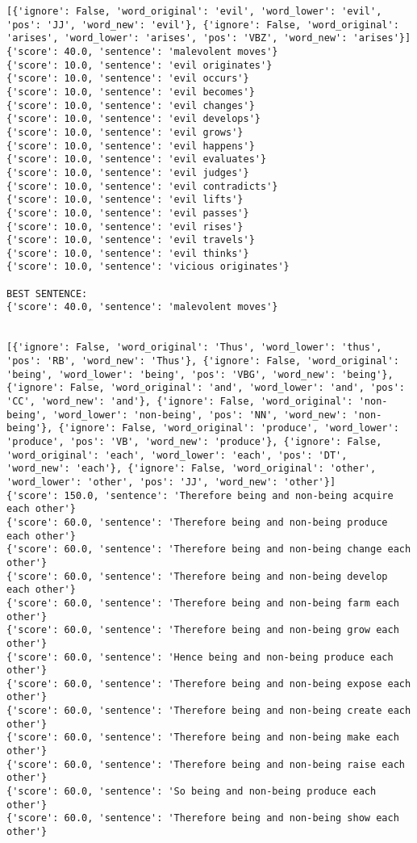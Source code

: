\documentclass[12pt,a4paper,oneside]{book}
\begin{document}
\begin{verbatim}
[{'ignore': False, 'word_original': 'evil', 'word_lower': 'evil', 'pos': 'JJ', 'word_new': 'evil'}, {'ignore': False, 'word_original': 'arises', 'word_lower': 'arises', 'pos': 'VBZ', 'word_new': 'arises'}]
{'score': 40.0, 'sentence': 'malevolent moves'}
{'score': 10.0, 'sentence': 'evil originates'}
{'score': 10.0, 'sentence': 'evil occurs'}
{'score': 10.0, 'sentence': 'evil becomes'}
{'score': 10.0, 'sentence': 'evil changes'}
{'score': 10.0, 'sentence': 'evil develops'}
{'score': 10.0, 'sentence': 'evil grows'}
{'score': 10.0, 'sentence': 'evil happens'}
{'score': 10.0, 'sentence': 'evil evaluates'}
{'score': 10.0, 'sentence': 'evil judges'}
{'score': 10.0, 'sentence': 'evil contradicts'}
{'score': 10.0, 'sentence': 'evil lifts'}
{'score': 10.0, 'sentence': 'evil passes'}
{'score': 10.0, 'sentence': 'evil rises'}
{'score': 10.0, 'sentence': 'evil travels'}
{'score': 10.0, 'sentence': 'evil thinks'}
{'score': 10.0, 'sentence': 'vicious originates'}

BEST SENTENCE:
{'score': 40.0, 'sentence': 'malevolent moves'}


[{'ignore': False, 'word_original': 'Thus', 'word_lower': 'thus', 'pos': 'RB', 'word_new': 'Thus'}, {'ignore': False, 'word_original': 'being', 'word_lower': 'being', 'pos': 'VBG', 'word_new': 'being'}, {'ignore': False, 'word_original': 'and', 'word_lower': 'and', 'pos': 'CC', 'word_new': 'and'}, {'ignore': False, 'word_original': 'non-being', 'word_lower': 'non-being', 'pos': 'NN', 'word_new': 'non-being'}, {'ignore': False, 'word_original': 'produce', 'word_lower': 'produce', 'pos': 'VB', 'word_new': 'produce'}, {'ignore': False, 'word_original': 'each', 'word_lower': 'each', 'pos': 'DT', 'word_new': 'each'}, {'ignore': False, 'word_original': 'other', 'word_lower': 'other', 'pos': 'JJ', 'word_new': 'other'}]
{'score': 150.0, 'sentence': 'Therefore being and non-being acquire each other'}
{'score': 60.0, 'sentence': 'Therefore being and non-being produce each other'}
{'score': 60.0, 'sentence': 'Therefore being and non-being change each other'}
{'score': 60.0, 'sentence': 'Therefore being and non-being develop each other'}
{'score': 60.0, 'sentence': 'Therefore being and non-being farm each other'}
{'score': 60.0, 'sentence': 'Therefore being and non-being grow each other'}
{'score': 60.0, 'sentence': 'Hence being and non-being produce each other'}
{'score': 60.0, 'sentence': 'Therefore being and non-being expose each other'}
{'score': 60.0, 'sentence': 'Therefore being and non-being create each other'}
{'score': 60.0, 'sentence': 'Therefore being and non-being make each other'}
{'score': 60.0, 'sentence': 'Therefore being and non-being raise each other'}
{'score': 60.0, 'sentence': 'So being and non-being produce each other'}
{'score': 60.0, 'sentence': 'Therefore being and non-being show each other'}


\end{verbatim}
\end{document}
